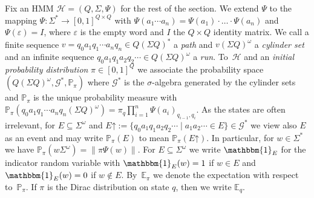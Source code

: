 \documentclass[a4paper,UKenglish,cleveref, autoref,mathscr]{lipics-v2019}
\newcommand{\RR}{\mathbb{R}}
\newcommand{\EE}{\mathbb{E}}
\newcommand{\NN}{\mathbb{N}}
\newcommand{\PP}{\mathbb{P}}
\newcommand{\GG}{\mathscr{G}}
\newcommand{\1}{\mathbbm{1}}
\renewcommand{\epsilon}{\varepsilon}
\renewcommand{\H}{\mathcal{H}}
\newcommand{\uparr}[1]{#1\mathord{\uparrow}}
\begin{document}
Fix an HMM $\H = (Q, \Sigma, \Psi)$ for the rest of the section.
We extend $\Psi$ to the mapping $\Psi : \Sigma^* \rightarrow [0,1]^{Q \times Q}$ with $\Psi(a_1 \cdots a_n) = \Psi(a_1) \cdot \ldots \cdot \Psi(a_n)$ and $\Psi(\epsilon) = I$, where $\epsilon$ is the empty word and $I$ the $Q \times Q$ identity matrix.
We call a finite sequence $v = q_0 a_1 q_1 \cdots a_n q_n \in Q (\Sigma Q)^*$ a \emph{path} and $v (\Sigma Q)^\omega$ a \emph{cylinder set} and an infinite sequence $q_0 a_1 q_1 a_2 q_2 \cdots \in Q (\Sigma Q)^\omega$ a \emph{run}.
To~$\H$ and an \emph{initial probability distribution} $\pi \in [0,1]^Q$ we associate the probability space $(Q(\Sigma Q)^\omega, \GG^*, \PP_\pi)$ where $\GG^*$ is the $\sigma$-algebra generated by the cylinder sets and $\PP_\pi$ is the unique probability measure with $\PP_\pi(q_0 a_1 q_1 \cdots a_n q_n (\Sigma Q)^\omega) = \pi_q \prod_{i=1}^{n} \Psi(a_i)_{q_{i-1},q_i}$.
As the states are often irrelevant, for $E \subseteq \Sigma^\omega$ and $\uparr{E} := \{q_0 a_1 q_1 a_2 q_2 \cdots \mid a_1 a_2 \cdots \in E\} \in \GG^*$ we view also $E$ as an event and may write $\PP_{\pi}(E)$ to mean $\PP_{\pi}(\uparr{E})$.
In particular, for $w \in \Sigma^*$ we have $\PP_{\pi}(w \Sigma^\omega) = \| \pi \Psi(w) \|$.
For $E \subseteq \Sigma^\omega$ we write $\1_E$ for the indicator random variable with $\1_E(w) = 1$ if $w \in E$ and $\1_E(w) = 0$ if $w \not\in E$.
By~$\EE_\pi$ we denote the expectation with respect to~$\PP_{\pi}$. If $\pi$ is the Dirac distribution on state $q$, then we write $\EE_{q}$.

\end{document}
